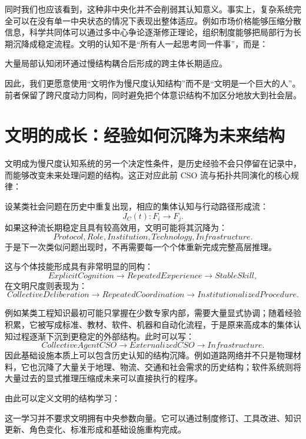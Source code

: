 同时我们也应该看到，这种非中央化并不会削弱其认知意义。事实上，复杂系统完全可以在没有单一中央状态的情况下表现出整体适应。例如市场价格能够压缩分散信息，科学共同体可以通过多中心争论逐渐修正理论，组织制度能够把局部行为长期沉降成稳定流程。文明的认知不是“所有人一起思考同一件事”，而是：
\begin{statementbox}
大量局部认知闭环通过慢结构耦合后形成的跨主体长期适应。
\end{statementbox}

因此，我们更愿意使用“文明作为慢尺度认知结构”而不是“文明是一个巨大的人”。前者保留了跨尺度动力同构，同时避免把个体意识结构不加区分地放大到社会层。

\section{文明的成长：经验如何沉降为未来结构}

文明成为慢尺度认知系统的另一个决定性条件，是历史经验不会只停留在记录中，而能够改变未来处理问题的结构。这正对应此前 CSO 流与拓扑共同演化的核心规律：
\begin{statementbox}
\centering
{}
\end{statementbox}

设某类社会问题在历史中重复出现，相应的集体认知与行动路径形成流：
\[
J_C(t):
F_i
\rightarrow
F_j.
\]
如果这种流长期稳定且具有较高效用，文明可能将其沉降为：
\[
Protocol,
Role,
Institution,
Technology,
Infrastructure.
\]
于是下一次类似问题出现时，不再需要每一个个体重新完成完整高层推理。

这与个体技能形成具有非常明显的同构：
\[
ExplicitCognition
\rightarrow
RepeatedExperience
\rightarrow
StableSkill,
\]
在文明尺度则表现为：
\[
CollectiveDeliberation
\rightarrow
RepeatedCoordination
\rightarrow
InstitutionalizedProcedure.
\]

例如某类工程知识最初可能只掌握在少数专家内部，需要大量显式协调；随着经验积累，它被写成标准、教材、软件、机器和自动化流程，于是原来高成本的集体认知过程逐渐下沉到更稳定的外部结构。此时可以写：
\[
CollectiveAgentCSO
\rightarrow
ExternalizedCSO
\rightarrow
Infrastructure.
\]
因此基础设施本质上可以包含历史认知的结构沉降。例如道路网络并不只是物理材料，它也沉降了大量关于地理、物流、交通和社会需求的历史结构；软件系统则将大量过去的显式推理压缩成未来可以直接执行的程序。

由此可以定义文明的结构学习：
\begin{statementbox}
\centering
{}
\end{statementbox}
这一学习并不要求文明拥有中央参数向量。它可以通过制度修订、工具改进、知识更新、角色变化、标准形成和基础设施重构完成。

